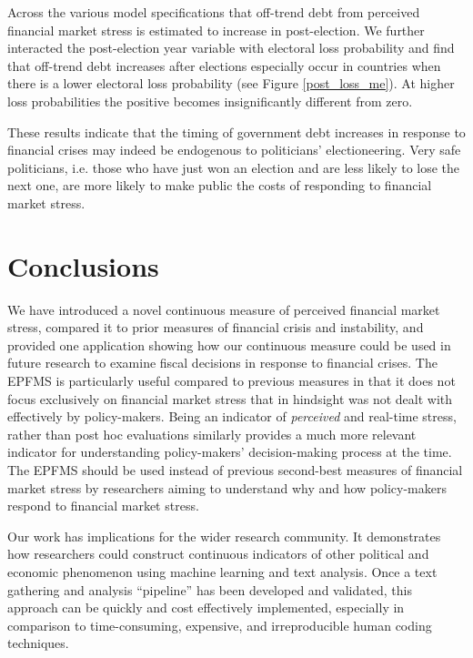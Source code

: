 \documentclass[]{article}
\begin{document}
Across the various model specifications that off-trend debt from perceived financial market stress is estimated to increase in post-election. We further interacted the post-election year variable with electoral loss probability and find that off-trend debt increases after elections especially occur in countries  when there is a lower electoral loss probability (see Figure \ref{post_loss_me}). At higher loss probabilities the positive becomes insignificantly different from zero.

These results indicate that the timing of government debt increases in response to financial crises may indeed be endogenous to politicians' electioneering. Very safe politicians, i.e. those who have just won an election and are less likely to lose the next one, are more likely to make public the costs of responding to financial market stress.


\section{Conclusions}\label{conclusions}

We have introduced a novel continuous measure of perceived financial market stress, compared it to prior measures of financial crisis and instability, and provided one application showing how our continuous measure could be used in future research to examine fiscal decisions in response to financial crises. The EPFMS is particularly useful compared to previous measures in that it does not focus exclusively on financial market stress that in hindsight was not dealt with effectively by policy-makers. Being an indicator of \emph{perceived} and real-time stress, rather than post hoc evaluations similarly provides a much more relevant indicator for understanding policy-makers' decision-making process at the time. The EPFMS should be used instead of previous second-best measures of financial market stress by researchers aiming to understand why and how policy-makers respond to financial market stress.

Our work has implications for the wider research community. It demonstrates how researchers could construct continuous indicators of other political and economic phenomenon using machine learning and text analysis. Once a text gathering and analysis ``pipeline'' \citep{Leek2015} has been developed and validated, this approach can be quickly and cost effectively implemented, especially in comparison to time-consuming, expensive, and irreproducible human coding techniques.
\end{document}

